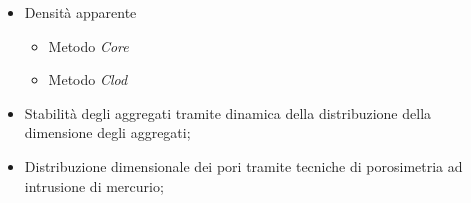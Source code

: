 \documentclass[10pt]{beamer}
\begin{document}
\begin{frame}
  \begin{columns}[c]
    \begin{itemize}[<+->]
    \item Densit\`a apparente
      \begin{itemize}
      \item Metodo \emph{Core}
      \pause
      \item Metodo \emph{Clod}
      \pause
      \end{itemize}
    \item Stabilit\`a degli aggregati tramite dinamica della
      distribuzione della dimensione degli aggregati;
    \item Distribuzione dimensionale dei pori tramite tecniche di
      porosimetria ad intrusione di mercurio;      
    \end{itemize}
    \begin{overlayarea}{\linewidth}{3cm}

\end{overlayarea}
\end{columns}
\end{frame}
\end{document}
